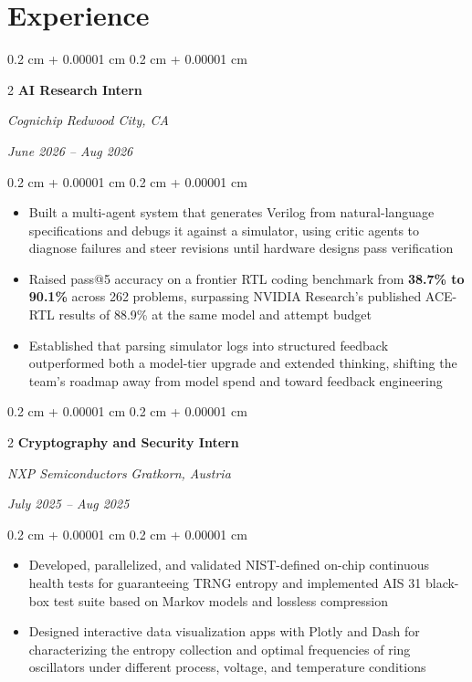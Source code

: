 \documentclass[10pt, letterpaper]{article}
\newenvironment{highlights}{ \begin{itemize}[ topsep=0.10 cm, parsep=0.10 cm, partopsep=0pt,
itemsep=0pt, leftmargin=0.4 cm + 10pt ] }{ \end{itemize} } %
\newenvironment{onecolentry}{ \begin{adjustwidth}{ 0.2 cm + 0.00001 cm }{ 0.2 cm + 0.00001 cm }
}{ \end{adjustwidth} } %
\newenvironment{twocolentry}[2][]{ \onecolentry \def\secondColumn{#2} \setcolumnwidth{\fill, 4.5 cm}
\begin{paracol}{2} }{ \switchcolumn \raggedleft \secondColumn \end{paracol}
\endonecolentry } %
\begin{document}
	\section{Experience}

    \begin{twocolentry}
		{ \textit{Redwood City, CA}

		\textit{June 2026 – Aug 2026}} \textbf{AI Research Intern}

		\textit{Cognichip}
	\end{twocolentry}

	\vspace{0.10 cm}
	\begin{onecolentry}
		\begin{highlights}
    		\item  Built a multi-agent system that generates Verilog from natural-language specifications and debugs it against a simulator, using critic agents to diagnose failures and steer revisions until hardware designs pass verification
            \item Raised pass@5 accuracy on a frontier RTL coding benchmark from \textbf{38.7\% to 90.1\%} across 262 problems, surpassing NVIDIA Research's published ACE-RTL results of 88.9\% at the same model and attempt budget
            \item Established that parsing simulator logs into structured feedback outperformed both a model-tier upgrade and extended thinking, shifting the team's roadmap away from model spend and toward feedback engineering
		\end{highlights}
	\end{onecolentry}

	\vspace{0.10 cm}

    \begin{twocolentry}
		{ \textit{Gratkorn, Austria}

		\textit{July 2025 – Aug 2025}} \textbf{Cryptography and Security Intern}

		\textit{NXP Semiconductors}
	\end{twocolentry}

	\vspace{0.10 cm}
	\begin{onecolentry}
		\begin{highlights}
    		\item Developed, parallelized, and validated NIST-defined on-chip continuous health tests for guaranteeing TRNG entropy and implemented AIS 31 black-box test suite based on Markov models and lossless compression
            \item Designed interactive data visualization apps with Plotly and Dash for characterizing the entropy collection and optimal frequencies of ring oscillators under different process, voltage, and temperature conditions
		\end{highlights}
	\end{onecolentry}
\end{document}
